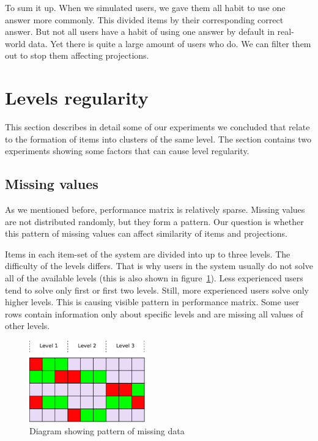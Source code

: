 \documentclass[
  print, %
  table,   %
  nolof,     %
  nolot,     %
  nocover,
  color,
  final,
]{fithesis3}
\begin{document}

To sum it up. When we simulated users, we gave them all habit to use one answer more commonly. This divided items by their corresponding correct answer. But not all users have a habit of using one answer by default in real-world data. Yet there is quite a large amount of users who do. We can filter them out to stop them affecting projections.


\section{Levels regularity}\label{evaulation-levels-regularity}

This section describes in detail some of our experiments we concluded that relate to the formation of items into clusters of the same level. The section contains two experiments showing some factors that can cause level regularity.


\subsection{Missing values}\label{missing-values}


As we mentioned before, performance matrix is relatively sparse. Missing values are not distributed randomly, but they form a pattern. Our question is whether this pattern of missing values can affect similarity of items and projections.


Items in each item-set of the system are divided into up to three levels. The difficulty of the levels differs. That is why users in the system usually do not solve all of the available levels (this is also shown in figure~\ref{fig:missing_pattern_diagram}). Less experienced users tend to solve only first or first two levels. Still, more experienced users solve only higher levels. This is causing visible pattern in performance matrix. Some user rows contain information only about specific levels and are missing all values of other levels.

\begin{figure}
  \includegraphics[width=5cm]{img/missing_pattern_diagram}
  \caption{Diagram showing pattern of missing data}
  \label{fig:missing_pattern_diagram}
\end{figure}
\end{document}
